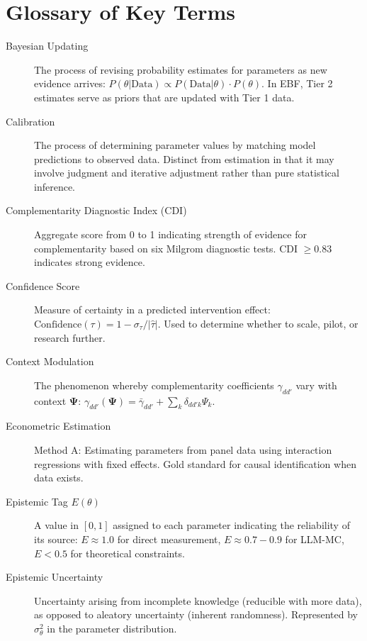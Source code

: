 \documentclass[11pt,a4paper]{article}
\theoremstyle{definition}
\begin{document}
\section{Glossary of Key Terms}
\label{sec:bbb-glossary}

\begin{description}

\item[Bayesian Updating]
The process of revising probability estimates for parameters as new evidence 
arrives: $P(\theta|\text{Data}) \propto P(\text{Data}|\theta) \cdot P(\theta)$.
In EBF, Tier 2 estimates serve as priors that are updated with Tier 1 data.

\item[Calibration]
The process of determining parameter values by matching model predictions to 
observed data. Distinct from estimation in that it may involve judgment and 
iterative adjustment rather than pure statistical inference.

\item[Complementarity Diagnostic Index (CDI)]
Aggregate score from 0 to 1 indicating strength of evidence for complementarity 
based on six Milgrom diagnostic tests. CDI $\geq 0.83$ indicates strong evidence.

\item[Confidence Score]
Measure of certainty in a predicted intervention effect: 
$\text{Confidence}(\tau) = 1 - \sigma_\tau/|\hat{\tau}|$. 
Used to determine whether to scale, pilot, or research further.

\item[Context Modulation]
The phenomenon whereby complementarity coefficients $\gamma_{dd'}$ vary with 
context $\boldsymbol{\Psi}$: $\gamma_{dd'}(\boldsymbol{\Psi}) = \bar{\gamma}_{dd'} + \sum_k \delta_{dd'k} \Psi_k$.

\item[Econometric Estimation]
Method A: Estimating parameters from panel data using interaction regressions 
with fixed effects. Gold standard for causal identification when data exists.

\item[Epistemic Tag $E(\theta)$]
A value in $[0, 1]$ assigned to each parameter indicating the reliability of 
its source: $E \approx 1.0$ for direct measurement, $E \approx 0.7-0.9$ for 
LLM-MC, $E < 0.5$ for theoretical constraints.

\item[Epistemic Uncertainty]
Uncertainty arising from incomplete knowledge (reducible with more data), 
as opposed to aleatory uncertainty (inherent randomness). Represented by 
$\sigma^2_\theta$ in the parameter distribution.


\end{description}
\end{document}
